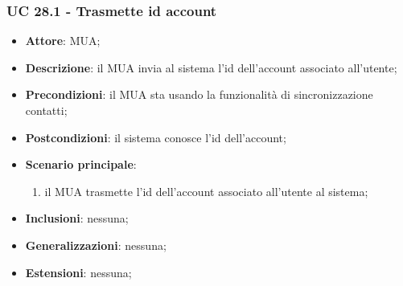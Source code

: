     \subsubsection{UC 28.1 - Trasmette id account} \label{sec:UC28.1}
    \begin{itemize}
        \item \textbf{Attore}: MUA;
        \item \textbf{Descrizione}: il MUA invia al sistema l'id dell'account associato all'utente;
        \item \textbf{Precondizioni}: il MUA sta usando la funzionalità di sincronizzazione contatti;
        \item \textbf{Postcondizioni}: il sistema conosce l'id dell'account;
        \item \textbf{Scenario principale}:
            \begin{enumerate}
                \item il MUA trasmette l'id dell'account associato all'utente al sistema;
            \end{enumerate}
        \item \textbf{Inclusioni}: nessuna;
        \item \textbf{Generalizzazioni}: nessuna;
        \item \textbf{Estensioni}: nessuna;
    \end{itemize}

